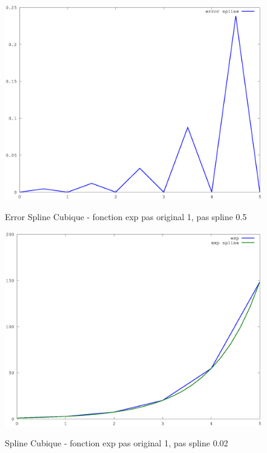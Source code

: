 \documentclass[a4paper,11pt]{article}
\begin{document}
\begin{figure}[h!]
  \begin{centering}
    \includegraphics[scale=0.5]{../exp_2_error}
    \label{rspro2}
    \par\end{centering}
  \caption{Error Spline Cubique - fonction exp pas original 1, pas spline 0.5}
  \label{fig:jacobi-conv}
\end{figure}

\begin{figure}[h!]
  \begin{centering}
    \includegraphics[scale=0.5]{../exp_5}
    \label{rspro2}
    \par\end{centering}
  \caption{Spline Cubique - fonction exp pas original 1, pas spline 0.02}
  \label{fig:jacobi-conv}
\end{figure}
\end{document}
